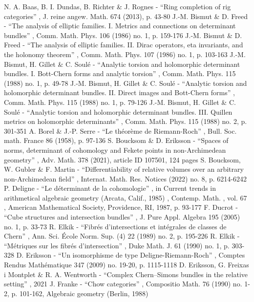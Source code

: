  N. A. Baas, B. I. Dundas, B. Richter \& J. Rognes - “Ring completion of rig categories” , J. reine angew. Math. 674 (2013), p. 43-80
 J.-M. Bismut \& D. Freed - “The analysis of elliptic families. I. Metrics and connections on determinant bundles” , Comm. Math. Phys. 106 (1986) no. 1, p. 159-176
 J.-M. Bismut \& D. Freed - “The analysis of elliptic families. II. Dirac operators, eta invariants, and the holonomy theorem” , Comm. Math. Phys. 107 (1986) no. 1, p. 103-163
 J.-M. Bismut, H. Gillet \& C. Soulé - “Analytic torsion and holomorphic determinant bundles. I. Bott-Chern forms and analytic torsion” , Comm. Math. Phys. 115 (1988) no. 1, p. 49-78
 J.-M. Bismut, H. Gillet \& C. Soulé - “Analytic torsion and holomorphic determinant bundles. II. Direct images and Bott-Chern forms” , Comm. Math. Phys. 115 (1988) no. 1, p. 79-126
 J.-M. Bismut, H. Gillet \& C. Soulé - “Analytic torsion and holomorphic determinant bundles. III. Quillen metrics on holomorphic determinants” , Comm. Math. Phys. 115 (1988) no. 2, p. 301-351
 A. Borel \& J.-P. Serre - “Le théorème de Riemann-Roch” , Bull. Soc. math. France 86 (1958), p. 97-136
 S. Boucksom \& D. Eriksson - “Spaces of norms, determinant of cohomology and Fekete points in non-Archimedean geometry” , Adv. Math. 378 (2021), article ID 107501, 124 pages
 S. Boucksom, W. Gubler \& F. Martin - “Differentiability of relative volumes over an arbitrary non-Archimedean field” , Internat. Math. Res. Notices (2022) no. 8, p. 6214-6242
 P. Deligne - “Le déterminant de la cohomologie” , in Current trends in arithmetical algebraic geometry (Arcata, Calif., 1985) , Contemp. Math. , vol. 67 , American Mathematical Society, Providence, RI, 1987, p. 93-177
 F. Ducrot - “Cube structures and intersection bundles” , J. Pure Appl. Algebra 195 (2005) no. 1, p. 33-73
 R. Elkik - “Fibrés d’intersections et intégrales de classes de Chern” , Ann. Sci. École Norm. Sup. (4) 22 (1989) no. 2, p. 195-226
 R. Elkik - “Métriques sur les fibrés d’intersection” , Duke Math. J. 61 (1990) no. 1, p. 303-328
 D. Eriksson - “Un isomorphisme de type Deligne-Riemann-Roch” , Comptes Rendus Mathématique 347 (2009) no. 19-20, p. 1115-1118
 D. Eriksson, G. Freixas i Montplet \& R. A. Wentworth - “Complex Chern–Simons bundles in the relative setting” , 2021
 J. Franke - “Chow categories” , Compositio Math. 76 (1990) no. 1-2, p. 101-162, Algebraic geometry (Berlin, 1988)

